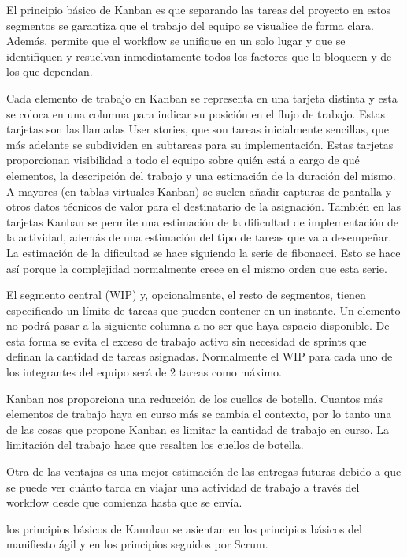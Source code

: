 El principio básico de Kanban es que separando las tareas del proyecto en estos segmentos se garantiza que el trabajo del equipo se visualice de forma clara. Además, permite que el workflow se unifique en un solo lugar y que se identifiquen y resuelvan inmediatamente todos los factores que lo bloqueen y de los que dependan.

Cada elemento de trabajo en Kanban se representa en una tarjeta distinta y esta se coloca en una columna para indicar su posición en el flujo de trabajo. Estas tarjetas son las llamadas User stories, que son tareas inicialmente sencillas, que más adelante se subdividen en subtareas para su implementación. Estas tarjetas proporcionan visibilidad a todo el equipo sobre quién está a cargo de qué elementos, la descripción del trabajo y una estimación de la duración del mismo. A mayores (en tablas virtuales Kanban) se suelen añadir capturas de pantalla y otros datos técnicos de valor para el destinatario de la asignación. También en las tarjetas Kanban se permite una estimación de la dificultad de implementación de la actividad, además de una estimación del tipo de tareas que va a desempeñar. La estimación de la dificultad se hace siguiendo la serie de fibonacci. Esto se hace así porque la complejidad normalmente crece en el mismo orden que esta serie. 

El segmento central (WIP) y, opcionalmente, el resto de segmentos, tienen especificado un límite de tareas que pueden contener en un instante. Un elemento no podrá pasar a la siguiente columna a no ser que haya espacio disponible. De esta forma se evita el exceso de trabajo activo sin necesidad de sprints que definan la cantidad de tareas asignadas. Normalmente el WIP para cada uno de los integrantes del equipo será de 2 tareas como máximo. 

Kanban nos proporciona una reducción de los cuellos de botella. Cuantos más elementos de trabajo haya en curso más se cambia el contexto, por lo tanto una de las cosas que propone Kanban es limitar la cantidad de trabajo en curso. La limitación del trabajo hace que resalten los cuellos de botella.

Otra de las ventajas es una mejor estimación de las entregas futuras debido a que se puede ver cuánto tarda en viajar una actividad de trabajo a través del workflow desde que comienza hasta que se envía.

los principios básicos de Kannban se asientan en los principios básicos del manifiesto ágil \cite{manifiestoAgil} y en los principios seguidos por Scrum. 

